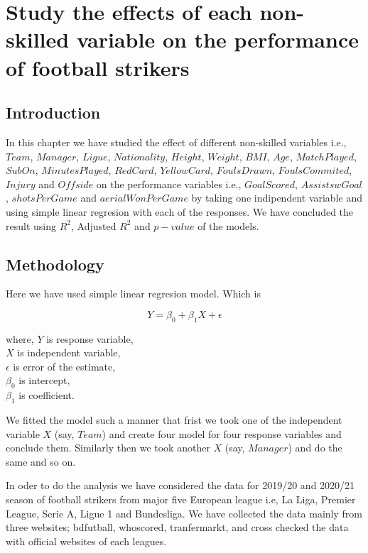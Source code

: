 \documentclass[12pt]{article}
\title{}
\author{}
\date{}
\begin{document}
\section{Study the effects of each non-skilled variable on the performance of football strikers}
\label{var1}
\subsection{Introduction}
In this chapter we have studied the effect of different non-skilled variables i.e., $ Team $, $ Manager $, $ Ligue $, $ Nationality $, $ Height $, $ Weight $, $ BMI $, $ Age $, $ MatchPlayed $, $ SubOn $, $ MinutesPlayed $, $ RedCard $, $ YellowCard $, $ FoulsDrawn $, $ FoulsCommited $, $ Injury $ and $ Offside $  on the performance variables i.e., $ GoalScored $, $ AssistswGoal $, $ shotsPerGame $ and $ aerialWonPerGame $ by taking one indipendent variable and using simple linear regresion with each of the responses. We have concluded the result using $ R^2 $, Adjusted $ R^2 $ and $ p-value $ of the models. 

\subsection{Methodology}
Here we have used simple linear regresion model. Which is 

\begin{minipage}{0.5\textwidth}
	$$ Y=\beta_0+\beta_1X+\epsilon $$
\end{minipage} 
\hfil
\begin{minipage}{0.5\textwidth}
where, $ Y $ is response variable, \\ $ X $ is independent variable, \\
 $ \epsilon $ is error of the estimate, \\ $ \beta_0 $ is intercept, \\ $ \beta_1 $ is coefficient.
\end{minipage} 

We fitted the model such a manner that frist we took one of the independent variable $ X $ (say, $ Team $) and create four model for four response variables and conclude them. Similarly then we took another $ X $ (say, $ Manager $) and do the same and so on. 

In oder to do the analysis we have considered the data for 2019/20 and 2020/21 season of football strikers from major five European league i.e, La Liga, Premier League, Serie A, Ligue 1 and Bundesliga. We have collected the data mainly from three websites; bdfutball, whoscored, tranfermarkt, and cross checked the data with official websites of each leagues. 
\end{document}

